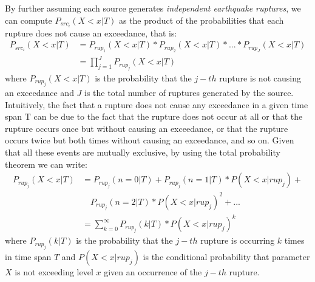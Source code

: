 By further assuming each source generates \textit{independent
earthquake ruptures}, we can compute $P_{src_{i}}(X < x | T)$ as the product of the probabilities that each rupture
does not cause an exceedance, that is:
\begin{align}
\label{eq:prup_noexceed_src}
P_{src_{i}}(X < x | T) & = P_{rup_{1}}(X < x | T) * P_{rup_{2}}(X < x | T) * ... * P_{rup_{J}}(X < x | T) \nonumber \\
			        & = \prod_{j=1}^{J} P_{rup_{j}}(X < x | T)
\end{align}
where $P_{rup_{j}}(X < x | T)$ is the probability that the $j-th$ rupture is not causing an exceedance and $J$ is
the total number of ruptures generated by the source. Intuitively, the fact that a rupture does not cause any
exceedance in a given time span T can be due to the fact that the rupture does not occur at all or that the
rupture occurs once but without causing an exceedance, or that the rupture occurs twice but both times
without causing an exceedance, and so on. Given that all these events are mutually exclusive, by using the
total probability theorem we can write:
\begin{align}
\label{eq:prup_noexceed_rup}
P_{rup_{j}}(X < x | T) & = P_{rup_{j}}(n = 0 | T) + P_{rup_{j}}(n = 1 | T) * P(X < x | rup_{j}) + \nonumber \\
                                &\quad	P_{rup_{j}}(n = 2 | T) * P(X < x | rup_{j})^{2}  + ... \nonumber \\
				 & = \sum_{k=0}^{\infty} P_{rup_{j}}(k | T) * P(X < x | rup_{j}) ^ {k} 
\end{align}
where $P_{rup_{j}}(k | T)$ is the probability that the $j-th$ rupture is occurring $k$ times in time span $T$ and
$P(X < x | rup_{j})$ is the conditional probability that parameter $X$ is not exceeding level $x$ given an
occurrence of the $j-th$ rupture.

